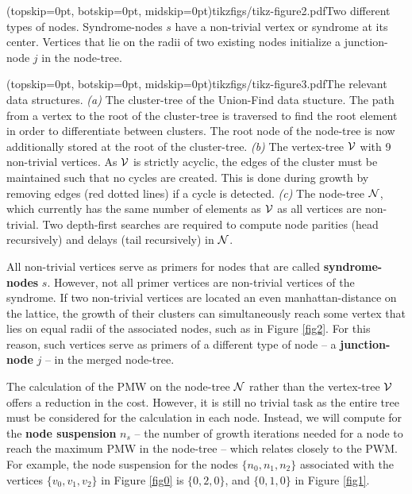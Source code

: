 \Figure[htb](topskip=0pt, botskip=0pt, midskip=0pt){tikzfigs/tikz-figure2.pdf}{Two different types of nodes. Syndrome-nodes $s$ have a non-trivial vertex or syndrome at its center. Vertices that lie on the radii of two existing nodes initialize a junction-node $j$ in the node-tree.\label{fig2}}

\Figure[hbt](topskip=0pt, botskip=0pt, midskip=0pt){tikzfigs/tikz-figure3.pdf}{The relevant data structures. \emph{(a)} The cluster-tree of the Union-Find data stucture. The path from a vertex to the root of the cluster-tree is traversed to find the root element in order to differentiate between clusters. The root node of the node-tree is now additionally stored at the root of the cluster-tree. \emph{(b)} The vertex-tree $\mathcal{V}$ with 9 non-trivial vertices. As $\mathcal{V}$ is strictly acyclic, the edges of the cluster must be maintained such that no cycles are created. This is done during growth by removing edges (red dotted lines) if a cycle is detected. \emph{(c)} The node-tree $\mathcal{N}$, which currently has the same number of elements as $\mathcal{V}$ as all vertices are non-trivial. Two depth-first searches are required to compute node parities (head recursively) and delays (tail recursively) in $\mathcal{N}$.\label{fig3}}

All non-trivial vertices serve as primers for nodes that are called \textbf{syndrome-nodes} $s$. However, not all primer vertices are non-trivial vertices of the syndrome. If two non-trivial vertices are located an even manhattan-distance on the lattice, the growth of their clusters can simultaneously reach some vertex that lies on equal radii of the associated nodes, such as in Figure \ref{fig2}. For this reason, such vertices serve as primers of a different type of node -- a \textbf{junction-node} $j$ -- in the merged node-tree. 

The calculation of the PMW on the node-tree $\mathcal{N}$ rather than the vertex-tree $\mathcal{V}$ offers a reduction in the cost. However, it is still no trivial task as the entire tree must be considered for the calculation in each node. Instead, we will compute for the \textbf{node suspension} $n_s$ -- the number of growth iterations needed for a node to reach the maximum PMW in the node-tree -- which relates closely to the PWM. For example, the node suspension for the nodes $\{n_0, n_1, n_2\}$ associated with the vertices $\{v_0, v_1, v_2\}$ in Figure \ref{fig0} is $\{0, 2, 0\}$, and $\{0, 1, 0\}$ in Figure \ref{fig1}.

